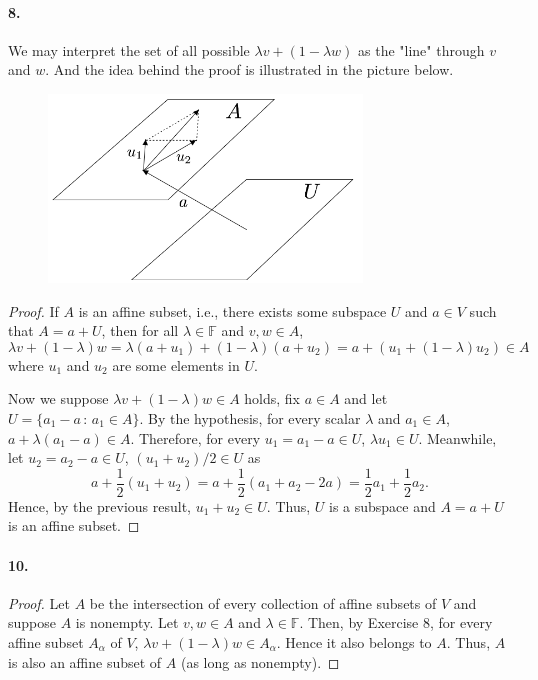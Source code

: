   \paragraph{8.}
    We may interpret the set of all possible $\lambda v+(1-\lambda w)$ as the 
    "line" through $v$ and $w$. And the idea behind the proof is illustrated in
    the picture below.
    \begin{figure}[htbp]
      \centering
      \includegraphics[height=5cm]{./image/3-d-8.png}
    \end{figure}
  \begin{proof}
    If $A$ is an affine subset, i.e., there exists some subspace $U$ and $a\in
    V$ such that $A=a+U$, then for all $\lambda\in\mathbb{F}$ and $v,w\in A$,
    \[
      \lambda v+(1-\lambda)w = \lambda(a+u_1) + (1-\lambda)(a+u_2) = 
      a + (u_1+(1-\lambda)u_2) \in A
    \]
    where $u_1$ and $u_2$ are some elements in $U$. \par
    Now we suppose $\lambda v+(1-\lambda)w\in A$ holds, fix $a\in A$ and let $U=
    \{a_1-a \,:\, a_1\in A\}$. By the hypothesis, for every scalar $\lambda$ and 
    $a_1\in A$, $a + \lambda(a_1-a)\in A$. Therefore, for every $u_1 = a_1-a \in
    U$, $\lambda u_1\in U$. Meanwhile, let $u_2=a_2-a\in U$, $(u_1 +u_2)/2\in U$
    as 
    \[
      a+\frac{1}{2}(u_1+u_2) = a + \frac{1}{2}(a_1+a_2-2a) = 
      \frac{1}{2}a_1+\frac{1}{2}a_2.
    \]
    Hence, by the previous result, $u_1+u_2\in U$. Thus, $U$ is a subspace and 
    $A=a+U$ is an affine subset.
  \end{proof}

  \paragraph{10.}
  \begin{proof}
    Let $A$ be the intersection of every collection of affine subsets of $V$ and
    suppose $A$ is nonempty. Let $v,w\in A$ and $\lambda\in\mathbb{F}$. Then, by
    Exercise 8, for every affine subset $A_{\alpha}$ of $V$, $\lambda v+ (1-
    \lambda)w\in A_\alpha$. Hence it also belongs to $A$. Thus, $A$ is also an
    affine subset of $A$ (as long as nonempty).
  \end{proof}

